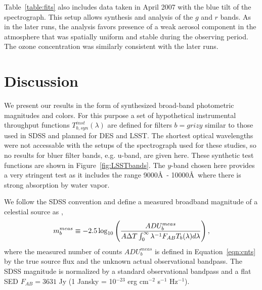 \documentclass[manuscript]{aastex}
\begin{document}
Table~\ref{table:fits} also includes data taken in April 2007 with the blue tilt of the spectrograph.
This setup allows synthesis and analysis of the $g$ and $r$ bands.
As in the later runs, the analysis favors presence of a weak aerosol component in the atmosphere that was
spatially uniform and stable during the observing period.
The ozone concentration was similarly consistent with the later runs.

\section{Discussion}

We present our results in the form of synthesized broad-band photometric magnitudes and colors.
For this purpose a set of hypothetical instrumental throughput functions $T^{inst}_{b,syn}(\lambda)$ are defined
for filters $b = grizy$ similar to those used in SDSS and planned for DES and LSST.
The shortest optical wavelengths were not accessable with the setups of the spectrograph used for these studies,
so no results for bluer filter bands, e.g. u-band, are given here. 
These synthetic test functions are shown in Figure~\ref{fig:LSSTbands}. 
The $y$-band chosen here provides a very stringent test as it includes
the range 9000\AA~- 10000\AA~where there is strong absorption by water vapor.

We follow the SDSS convention and define a measured broadband magnitude of a celestial source as \cite{fukugita96},
\begin{equation}
\label{eqn:ABmag}
     m_b^{meas} \equiv -2.5\log_{10}\left( { ADU_b^{meas} \over A \Delta T \int_0^\infty \lambda^{-1} F_{AB} T_b(\lambda) d\lambda } \right),
\end{equation}
where the measured number of counts $ADU_b^{meas}$ is defined in Equation~\ref{eqn:cnts} by the true source flux and the unknown actual observational bandpass.
The SDSS magnitude is normalized by a standard observational bandpass
and a flat SED $F_{AB} = 3631$ Jy (1 Jansky = 10$^{-23}$ erg cm$^{-2}$ s$^{-1}$ Hz$^{-1}$).
\end{document}
